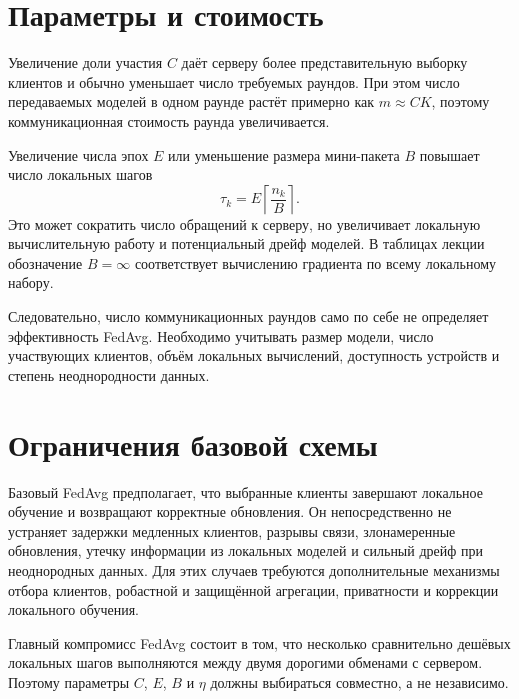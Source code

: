\section{Параметры и стоимость}

Увеличение доли участия \(C\) даёт серверу более представительную
выборку клиентов и обычно уменьшает число требуемых раундов. При этом
число передаваемых моделей в одном раунде растёт примерно как
\(m\approx CK\), поэтому коммуникационная стоимость раунда
увеличивается.

Увеличение числа эпох \(E\) или уменьшение размера мини-пакета \(B\)
повышает число локальных шагов
\[
    \tau_k
    =
    E\left\lceil\frac{n_k}{B}\right\rceil.
\]
Это может сократить число обращений к серверу, но увеличивает локальную
вычислительную работу и потенциальный дрейф моделей. В таблицах
лекции обозначение \(B=\infty\) соответствует вычислению градиента по
всему локальному набору.

Следовательно, число коммуникационных раундов само по себе не
определяет эффективность FedAvg. Необходимо учитывать размер модели,
число участвующих клиентов, объём локальных вычислений, доступность
устройств и степень неоднородности данных.

\section{Ограничения базовой схемы}

Базовый FedAvg предполагает, что выбранные клиенты завершают локальное
обучение и возвращают корректные обновления. Он непосредственно не
устраняет задержки медленных клиентов, разрывы связи, злонамеренные
обновления, утечку информации из локальных моделей и сильный дрейф
при неоднородных данных. Для этих случаев требуются дополнительные
механизмы отбора клиентов, робастной и защищённой агрегации,
приватности и коррекции локального обучения.

Главный компромисс FedAvg состоит в том, что несколько сравнительно
дешёвых локальных шагов выполняются между двумя дорогими обменами с
сервером. Поэтому параметры \(C\), \(E\), \(B\) и \(\eta\) должны
выбираться совместно, а не независимо.
